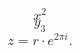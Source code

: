 \documentclass{article}
\begin{document}
\[ x^2 \]
\[ y_3 \]
\[ z = r\cdot e^{2\pi i}. \]
\end{document}
